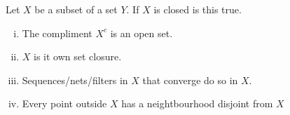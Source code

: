 \documentclass{article}
\theoremstyle{remark}
\begin{document}
\begin{definition}

  Let $X$ be a subset of a set $Y$.
  If $X$ is closed is this true.
  \begin{enumerate}[(i)]
    \item The compliment $X^{c}$ is an open set.
    \item $X$ is it own set closure.
    \item Sequences/nets/filters in $X$ that converge do so in $X$.
    \item Every point outside  $X$ has a neightbourhood disjoint from $X$
  \end{enumerate}

\end{definition}
\end{document}
